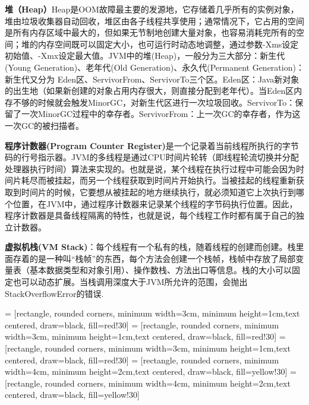\documentclass[../../../interview-questions.tex]{subfiles}
\begin{document}
\textbf{堆（Heap）}Heap是OOM故障最主要的发源地，它存储着几乎所有的实例对象，堆由垃圾收集器自动回收，堆区由各子线程共享使用；通常情况下，它占用的空间是所有内存区域中最大的，但如果无节制地创建大量对象，也容易消耗完所有的空间；堆的内存空间既可以固定大小，也可运行时动态地调整，通过参数-Xms设定初始值、-Xmx设定最大值。JVM中的堆(Heap)，一般分为三大部分：新生代(Young Generation)、老年代(Old Generation)、永久代(Permanent Generation)：新生代又分为 Eden区、ServivorFrom、ServivorTo三个区。Eden区：Java新对象的出生地（如果新创建的对象占用内存很大，则直接分配到老年代）。当Eden区内存不够的时候就会触发MinorGC，对新生代区进行一次垃圾回收。ServivorTo：保留了一次MinorGC过程中的幸存者。ServivorFrom：上一次GC的幸存者，作为这一次GC的被扫描者。

\textbf{程序计数器(Program Counter Register)}是一个记录着当前线程所执行的字节码的行号指示器。JVM的多线程是通过CPU时间片轮转（即线程轮流切换并分配处理器执行时间）算法来实现的。也就是说，某个线程在执行过程中可能会因为时间片耗尽而被挂起，而另一个线程获取到时间片开始执行。当被挂起的线程重新获取到时间片的时候，它要想从被挂起的地方继续执行，就必须知道它上次执行到哪个位置，在JVM中，通过程序计数器来记录某个线程的字节码执行位置。因此，程序计数器是具备线程隔离的特性，也就是说，每个线程工作时都有属于自己的独立计数器。

\textbf{虚拟机栈(VM Stack)}：每个线程有一个私有的栈，随着线程的创建而创建。栈里面存着的是一种叫“栈帧”的东西，每个方法会创建一个栈帧，栈帧中存放了局部变量表（基本数据类型和对象引用）、操作数栈、方法出口等信息。栈的大小可以固定也可以动态扩展。当栈调用深度大于JVM所允许的范围，会抛出StackOverflowError的错误.

 = [rectangle, rounded corners, minimum width=3cm, minimum height=1cm,text centered, draw=black, fill=red!30]
 = [rectangle, rounded corners, minimum width=3cm, minimum height=1cm,text centered, draw=black, fill=red!30]
 = [rectangle, rounded corners, minimum width=3cm, minimum height=1cm,text centered, draw=black, fill=red!30]
 = [rectangle, rounded corners, minimum width=4cm, minimum height=2cm,text centered, draw=black, fill=yellow!30]
 = [rectangle, rounded corners, minimum width=4cm, minimum height=2cm,text centered, draw=black, fill=yellow!30]
\end{document}
